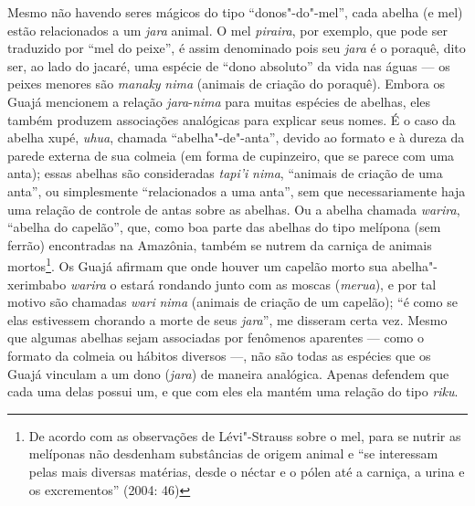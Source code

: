 Mesmo não havendo seres mágicos do tipo ``donos"-do"-mel'', cada abelha (e
mel) estão relacionados a um \emph{jara} animal. O mel \emph{piraira},
por exemplo, que pode ser traduzido por ``mel do peixe'', é assim
denominado pois seu \emph{jara} é o poraquê, dito ser, ao lado do
jacaré, uma espécie de ``dono absoluto'' da vida nas águas --- os peixes
menores são \emph{manaky} \emph{nima} (animais de criação do poraquê).
Embora os Guajá mencionem a relação \emph{jara}-\emph{nima} para muitas
espécies de abelhas, eles também produzem associações analógicas para
explicar seus nomes. É o caso da abelha xupé, \emph{uhua}, chamada
``abelha"-de"-anta'', devido ao formato e à dureza da parede externa de sua
colmeia (em forma de cupinzeiro, que se parece com uma anta); essas
abelhas são consideradas \emph{tapi'i} \emph{nima}, ``animais de criação
de uma anta'', ou simplesmente ``relacionados a uma anta'', sem que
necessariamente haja uma relação de controle de antas sobre as abelhas.
Ou a abelha chamada \emph{warira}, ``abelha do capelão'', que, como boa
parte das abelhas do tipo melípona (sem ferrão) encontradas na Amazônia,
também se nutrem da carniça de animais mortos\footnote{De acordo com as
  observações de Lévi"-Strauss sobre o mel, para se nutrir as melíponas
  não desdenham substâncias de origem animal e ``se interessam pelas mais
diversas matérias, desde o néctar e o pólen até a carniça, a urina e
os excrementos'' (2004: 46)}. Os Guajá afirmam que onde houver um
capelão morto sua abelha"-xerimbabo \emph{warira} o estará rondando junto
com as moscas (\emph{merua}), e por tal motivo são chamadas \emph{wari}
\emph{nima} (animais de criação de um capelão); ``é como se elas
estivessem chorando a morte de seus \emph{jara}'', me disseram certa vez.
Mesmo que algumas abelhas sejam associadas por fenômenos aparentes ---
como o formato da colmeia ou hábitos diversos ---, não são todas as
espécies que os Guajá vinculam a um dono (\emph{jara}) de maneira
analógica. Apenas defendem que cada uma delas possui um, e que com eles
ela mantém uma relação do tipo \emph{riku}.

